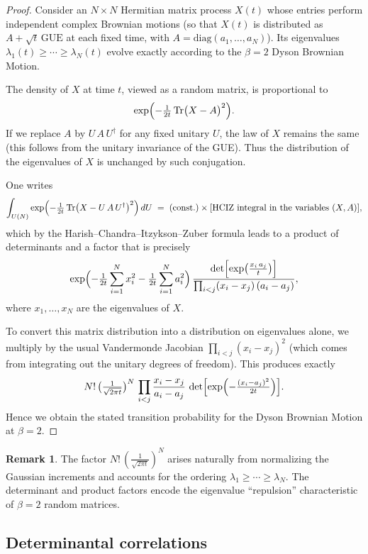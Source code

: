 \documentclass[letterpaper,11pt,oneside,reqno]{article}
\numberwithin{equation}{section}
\theoremstyle{definition}
\newtheorem{remark}[proposition]{Remark}
\begin{document}
\begin{proof}
Consider an \(N\times N\) Hermitian matrix process \(X(t)\) whose entries perform independent complex Brownian motions (so that \(X(t)\) is distributed as \(A + \sqrt{t}\,\mathrm{GUE}\) at each fixed time, with \(A=\mathrm{diag}(a_1,\dots,a_N)\)).  Its eigenvalues \(\lambda_1(t)\ge \cdots \ge \lambda_N(t)\) evolve exactly according to the \(\beta=2\) Dyson Brownian Motion.

The density of \(X\) at time \(t\), viewed as a random matrix, is proportional to
\[
\exp\Bigl(-\tfrac{1}{2t}\,\mathrm{Tr}\bigl(X-A\bigr)^2\Bigr).
\]
If we replace \(A\) by \(U\,A\,U^\dagger\) for any fixed unitary \(U\), the law of \(X\) remains the same (this follows from the unitary invariance of the GUE).  Thus the distribution of the eigenvalues of \(X\) is unchanged by such conjugation.

One writes
\[
\int_{U(N)}
\exp\Bigl(-\tfrac{1}{2t}\,\mathrm{Tr}\bigl(X-U\,A\,U^\dagger\bigr)^2\Bigr)\,dU
\;=\;
\text{(const.)} \times
\text{[HCIZ integral in the variables }(X,A)\text{]},
\]
which by the Harish--Chandra--Itzykson--Zuber formula leads to a product of determinants and a factor that is precisely
\[
\exp\Bigl(-\tfrac{1}{2t}\sum_{i=1}^N x_i^2
- \tfrac{1}{2t}\sum_{i=1}^N a_i^2\Bigr)\,
\frac{\det\Bigl[\exp\bigl(\tfrac{x_i\,a_j}{t}\bigr)\Bigr]}{\prod_{i<j}(x_i - x_j)\,(a_i - a_j)},
\]
where \(x_1,\dots,x_N\) are the eigenvalues of \(X\).

To convert this matrix distribution into a distribution on eigenvalues alone, we multiply by the usual Vandermonde Jacobian
\(\prod_{i<j}(x_i - x_j)^2\)
(which comes from integrating out the unitary degrees of freedom).  This produces exactly
\[
N!\,\bigl(\tfrac{1}{\sqrt{2\pi t}}\bigr)^{N}\,
\prod_{i<j}\frac{x_i - x_j}{a_i - a_j}
\,\det\Bigl[\exp\Bigl(-\tfrac{(x_i - a_j)^2}{2t}\Bigr)\Bigr].
\]
Hence we obtain the stated transition probability for the Dyson Brownian Motion at \(\beta=2\).
\end{proof}

\begin{remark}
The factor \(N!\,(\tfrac{1}{\sqrt{2\pi t}})^N\) arises naturally from normalizing the Gaussian increments and accounts for the ordering \(\lambda_1\ge\cdots\ge \lambda_N\).  The determinant and product factors encode the eigenvalue ``repulsion'' characteristic of \(\beta=2\) random matrices.
\end{remark}


\subsection{Determinantal correlations}
\end{document}
